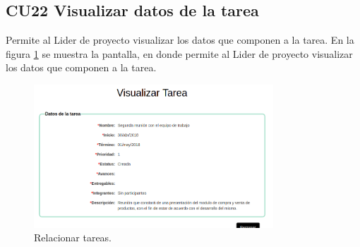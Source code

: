 \subsection{CU22 Visualizar datos de la tarea}
{
\justify
{}
}

\justify
Permite al Lider de proyecto visualizar los datos que componen a la tarea.
{
\justify
{}
}
\justify
En la figura \ref{fig:IU23} se muestra la pantalla, en donde permite al Lider de proyecto visualizar los datos que componen a la tarea.

\begin{figure}[htb]
\centering
\includegraphics[width=0.8\textwidth]{./images/cu23-visualizar-datos-tarea.png}
\caption{Relacionar tareas.} \label{fig:IU23}
\end{figure}